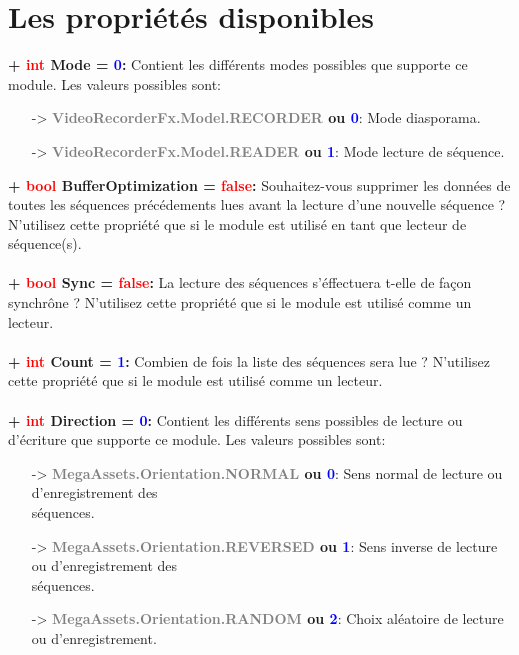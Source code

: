 \documentclass[a4paper, 11pt]{article}
\begin{document}
	\section{Les propriétés disponibles}
	\textbf{+ \textcolor{red}{int} Mode = \textcolor{blue}{0}:} Contient les différents modes possibles que
	supporte ce module. Les valeurs possibles sont:
	\begin{itemize}
		\item[-> \textbf{\textcolor{gray}{VideoRecorderFx.Model.RECORDER} ou \textcolor{blue}{0}}:] Mode
		diasporama.
		\item[-> \textbf{\textcolor{gray}{VideoRecorderFx.Model.READER} ou \textcolor{blue}{1}}:] Mode
		lecture de séquence.\\
	\end{itemize}
	\textbf{+ \textcolor{red}{bool} BufferOptimization = \textcolor{red}{false}:} Souhaitez-vous supprimer 
	les données de toutes les séquences précédements lues avant la lecture d'une nouvelle séquence ?
	N'utilisez cette propriété que si le module est utilisé en tant que lecteur de séquence(s).\\\\
	\textbf{+ \textcolor{red}{bool} Sync = \textcolor{red}{false}:} La lecture des séquences s'éffectuera
	t-elle de façon synchrône ? N'utilisez cette propriété que si le module est utilisé comme un lecteur.\\
	\\
	\textbf{+ \textcolor{red}{int} Count = \textcolor{blue}{1}:} Combien de fois la liste des séquences sera 
	lue ? N'utilisez cette propriété que si le module est utilisé comme un lecteur.\\\\
	\textbf{+ \textcolor{red}{int} \hypertarget{direction}{Direction} = \textcolor{blue}{0}:} Contient les 
	différents sens possibles de lecture ou d'écriture que supporte ce module. Les valeurs possibles sont:
	\begin{itemize}
		\item[-> \textbf{\textcolor{gray}{MegaAssets.Orientation.NORMAL} ou \textcolor{blue}{0}}:] Sens
		normal de lecture ou d'enregistrement des \\séquences.
		\item[-> \textbf{\textcolor{gray}{MegaAssets.Orientation.REVERSED} ou \textcolor{blue}{1}}:] Sens
		inverse de lecture ou d'enregistrement des \\séquences.
		\item[-> \textbf{\textcolor{gray}{MegaAssets.Orientation.RANDOM} ou \textcolor{blue}{2}}:] Choix
		aléatoire de lecture ou d'enregistrement.\\
	\end{itemize}
\end{document}
